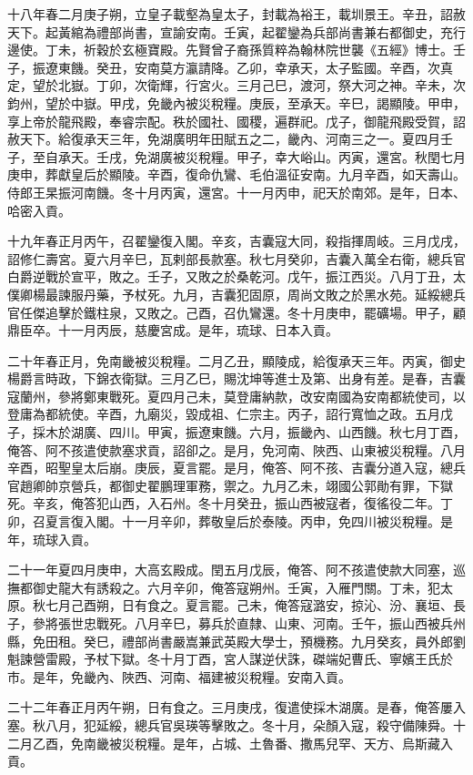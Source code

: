 \begin{pinyinscope}
十八年春二月庚子朔，立皇子載壑為皇太子，封載為裕王，載圳景王。辛丑，詔赦天下。起黃綰為禮部尚書，宣諭安南。壬寅，起翟鑾為兵部尚書兼右都御史，充行邊使。丁未，祈穀於玄極寶殿。先賢曾子裔孫質粹為翰林院世襲《五經》博士。壬子，振遼東饑。癸丑，安南莫方瀛請降。乙卯，幸承天，太子監國。辛酉，次真定，望於北嶽。丁卯，次衛輝，行宮火。三月己巳，渡河，祭大河之神。辛未，次鈞州，望於中嶽。甲戌，免畿內被災稅糧。庚辰，至承天。辛巳，謁顯陵。甲申，享上帝於龍飛殿，奉睿宗配。秩於國社、國稷，遍群祀。戊子，御龍飛殿受賀，詔赦天下。給復承天三年，免湖廣明年田賦五之二，畿內、河南三之一。夏四月壬子，至自承天。壬戌，免湖廣被災稅糧。甲子，幸大峪山。丙寅，還宮。秋閏七月庚申，葬獻皇后於顯陵。辛酉，復命仇鸞、毛伯溫征安南。九月辛酉，如天壽山。侍郎王杲振河南饑。冬十月丙寅，還宮。十一月丙申，祀天於南郊。是年，日本、哈密入貢。

十九年春正月丙午，召翟鑾復入閣。辛亥，吉囊寇大同，殺指揮周岐。三月戊戌，詔修仁壽宮。夏六月辛巳，瓦剌部長款塞。秋七月癸卯，吉囊入萬全右衛，總兵官白爵逆戰於宣平，敗之。壬子，又敗之於桑乾河。戊午，振江西災。八月丁丑，太僕卿楊最諫服丹藥，予杖死。九月，吉囊犯固原，周尚文敗之於黑水苑。延綏總兵官任傑追擊於鐵柱泉，又敗之。己酉，召仇鸞還。冬十月庚申，罷礦場。甲子，顧鼎臣卒。十一月丙辰，慈慶宮成。是年，琉球、日本入貢。

二十年春正月，免南畿被災稅糧。二月乙丑，顯陵成，給復承天三年。丙寅，御史楊爵言時政，下錦衣衛獄。三月乙巳，賜沈坤等進士及第、出身有差。是春，吉囊寇蘭州，參將鄭東戰死。夏四月己未，莫登庸納款，改安南國為安南都統使司，以登庸為都統使。辛酉，九廟災，毀成祖、仁宗主。丙子，詔行寬恤之政。五月戊子，採木於湖廣、四川。甲寅，振遼東饑。六月，振畿內、山西饑。秋七月丁酉，俺答、阿不孩遣使款塞求貢，詔卻之。是月，免河南、陜西、山東被災稅糧。八月辛酉，昭聖皇太后崩。庚辰，夏言罷。是月，俺答、阿不孩、吉囊分道入寇，總兵官趙卿帥京營兵，都御史翟鵬理軍務，禦之。九月乙未，翊國公郭勛有罪，下獄死。辛亥，俺答犯山西，入石州。冬十月癸丑，振山西被寇者，復徭役二年。丁卯，召夏言復入閣。十一月辛卯，葬敬皇后於泰陵。丙申，免四川被災稅糧。是年，琉球入貢。

二十一年夏四月庚申，大高玄殿成。閏五月戊辰，俺答、阿不孩遣使款大同塞，巡撫都御史龍大有誘殺之。六月辛卯，俺答寇朔州。壬寅，入雁門關。丁未，犯太原。秋七月己酉朔，日有食之。夏言罷。己未，俺答寇潞安，掠沁、汾、襄垣、長子，參將張世忠戰死。八月辛巳，募兵於直隸、山東、河南。壬午，振山西被兵州縣，免田租。癸巳，禮部尚書嚴嵩兼武英殿大學士，預機務。九月癸亥，員外郎劉魁諫營雷殿，予杖下獄。冬十月丁酉，宮人謀逆伏誅，磔端妃曹氏、寧嬪王氏於市。是年，免畿內、陜西、河南、福建被災稅糧。安南入貢。

二十二年春正月丙午朔，日有食之。三月庚戌，復遣使採木湖廣。是春，俺答屢入塞。秋八月，犯延綏，總兵官吳瑛等擊敗之。冬十月，朵顏入寇，殺守備陳舜。十二月乙酉，免南畿被災稅糧。是年，占城、土魯番、撒馬兒罕、天方、烏斯藏入貢。


\end{pinyinscope}
